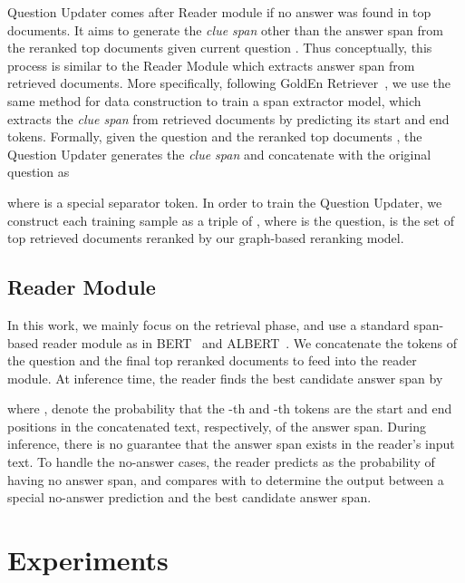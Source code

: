 \documentclass[sigconf]{acmart}
\begin{document}
Question Updater comes after Reader module if no answer was found in top  documents. It aims to generate the \textit{clue span} other than the answer span from the reranked top  documents given current question . Thus conceptually, this process is similar to the Reader Module which extracts answer span from retrieved documents. More specifically, following GoldEn Retriever~\citep{qi-etal-2019-answering}, we use the same method for data construction to train a span extractor model, which extracts the \textit{clue span} from retrieved documents by predicting its start and end tokens. Formally, given the question  and the reranked top  documents , the Question Updater generates the \textit{clue span}  and concatenate  with the original question  as

where  is a special separator token. In order to train the Question Updater, we construct each training sample as a triple of , where  is the question,  is the set of top  retrieved documents reranked by our graph-based reranking model.


\subsection{Reader Module}
In this work, we mainly focus on the retrieval phase, and use a standard span-based reader module as in BERT~\citep{devlin-etal-2019-bert} and ALBERT~\citep{Lan2020ALBERT:}. We concatenate the tokens of the question  and the final top  reranked documents to feed into the reader module. At inference time, the reader finds the best candidate answer span by

where ,  denote the probability that the -th and -th tokens are the start and end positions in the concatenated text, respectively, of the answer span. During inference, there is no guarantee that the answer span exists in the reader's input text. To handle the no-answer cases, the reader predicts  as the probability of having no answer span, and compares  with  to determine the output between a special no-answer prediction and the best candidate answer span.









\section{Experiments}
\end{document}
